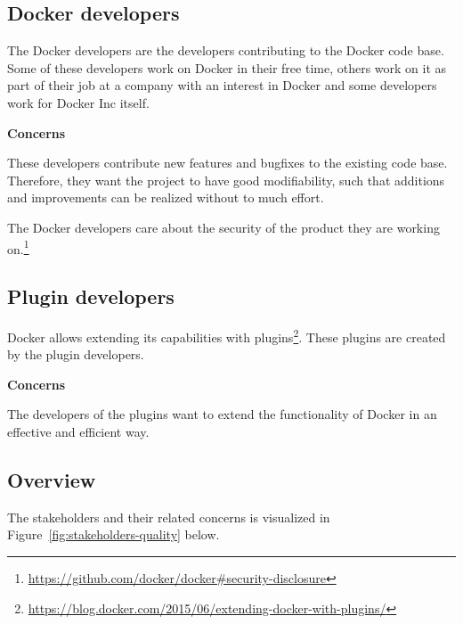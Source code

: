 \subsection*{Docker developers}
The Docker developers are the developers contributing to the Docker code base. Some of these developers work on Docker in their free time, others work on it as part of their job at a company with an interest in Docker and some developers work for Docker Inc itself\cite{whoaredockerdevs}.

\textbf{Concerns}
\begin{description}[labelindent=25pt,style=multiline,leftmargin=4.0cm,font=\normalfont\itshape]

\item[\textbf{Maintainability} \textit{(Modifiability)}] These developers contribute new features and bugfixes to the existing code base. Therefore, they want the project to have good modifiability, such that additions and improvements can be realized without to much effort.

\item[\textbf{Security}] The Docker developers care about the security of the product they are working on.\footnote{\url{https://github.com/docker/docker\#security-disclosure}}  %


\end{description}

\subsection*{Plugin developers}
Docker allows extending its capabilities with plugins\footnote{\url{https://blog.docker.com/2015/06/extending-docker-with-plugins/}}. These plugins are created by the plugin developers.

\textbf{Concerns}
\begin{description}[labelindent=25pt,style=multiline,leftmargin=4.0cm,font=\normalfont\itshape]

\item[\textbf{Portability} (Adaptability)] The developers of the plugins want to extend the functionality of Docker in an effective and efficient way. 

\end{description}

\subsection*{Overview}
The stakeholders and their related concerns is visualized in Figure~\ref{fig:stakeholders-quality} below.

